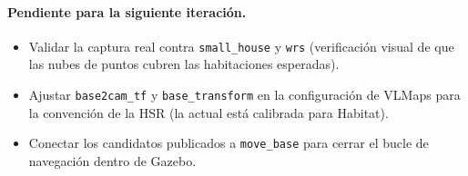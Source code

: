 \documentclass[11pt,a4paper]{article}
\begin{document}
\paragraph{Pendiente para la siguiente iteración.}
\begin{itemize}
  \item Validar la captura real contra \texttt{small\_house} y
        \texttt{wrs} (verificación visual de que las nubes de puntos
        cubren las habitaciones esperadas).
  \item Ajustar \texttt{base2cam\_tf} y \texttt{base\_transform} en la
        configuración de VLMaps para la convención de la HSR (la actual
        está calibrada para Habitat).
  \item Conectar los candidatos publicados a \texttt{move\_base} para
        cerrar el bucle de navegación dentro de Gazebo.
\end{itemize}
\end{document}
